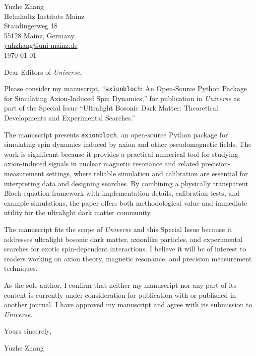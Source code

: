 \documentclass[11pt,a4paper]{article}
\newcommand{\axionbloch}{\texttt{axionbloch}}
\begin{document}
\begin{flushright}
Yuzhe Zhang \\
Helmholtz Institute Mainz \\
Staudingerweg 18 \\
55128 Mainz, Germany \\
\href{mailto:yuhzhang@uni-mainz.de}{yuhzhang@uni-mainz.de} \\
\today
\end{flushright}

Dear Editors of \textit{Universe},

Please consider my manuscript, ``\axionbloch: An Open-Source Python Package for Simulating Axion-Induced Spin Dynamics,'' for publication in \textit{Universe} as part of the Special Issue ``Ultralight Bosonic Dark Matter: Theoretical Developments and Experimental Searches.''

The manuscript presents \axionbloch{}, an open-source Python package for simulating spin dynamics induced by axion and other pseudomagnetic fields. The work is significant because it provides a practical numerical tool for studying axion-induced signals in nuclear magnetic resonance and related precision-measurement settings, where reliable simulation and calibration are essential for interpreting data and designing searches. By combining a physically transparent Bloch-equation framework with implementation details, calibration tests, and example simulations, the paper offers both methodological value and immediate utility for the ultralight dark matter community.

The manuscript fits the scope of \textit{Universe} and this Special Issue because it addresses ultralight bosonic dark matter, axionlike particles, and experimental searches for exotic spin-dependent interactions. I believe it will be of interest to readers working on axion theory, magnetic resonance, and precision measurement techniques.

As the sole author, I confirm that neither my manuscript nor any part of its content is currently under consideration for publication with or published in another journal.
I have approved my manuscript and agree with its submission to \textit{Universe}.

\vspace{1.5em}

\noindent Yours sincerely,

\noindent Yuzhe Zhang
\end{document}
